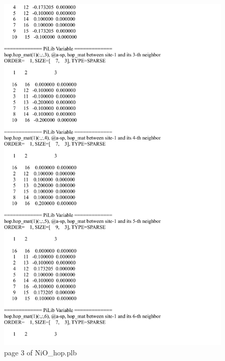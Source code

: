 \documentclass[10pt,a4paper]{article}
\begin{document}
\begin{figure}[tbp]
\centering
\includegraphics[width=0.9\columnwidth]{NiO_hop_p3.pdf}
\caption{page 3 of NiO\_hop.plb}
\end{figure}
\end{document}

